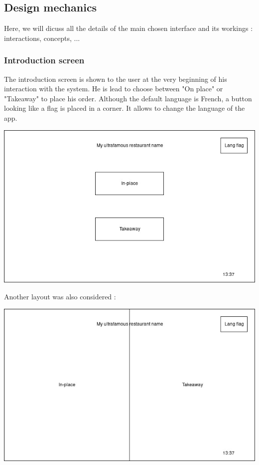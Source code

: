 \documentclass[a4paper,12pt]{article}
\begin{document}
\subsection{Design mechanics}

Here, we will dicuss all the details of the main chosen interface and its workings : interactions, concepts, ...

\subsubsection{Introduction screen}

The introduction screen is shown to the user at the very beginning of his interaction with the system. He is lead to
choose between "On place" or "Takeaway" to place his order. Although the default language is French, a button
looking like a flag is placed in a corner. It allows to change the language of the app.

\begin{center}
	\includegraphics[width=\textwidth]{intro_screen.jpg}
\end{center}

Another layout was also considered :

\begin{center}
	\includegraphics[width=\textwidth]{alt_intro_screen.jpg}
\end{center}
\end{document}
